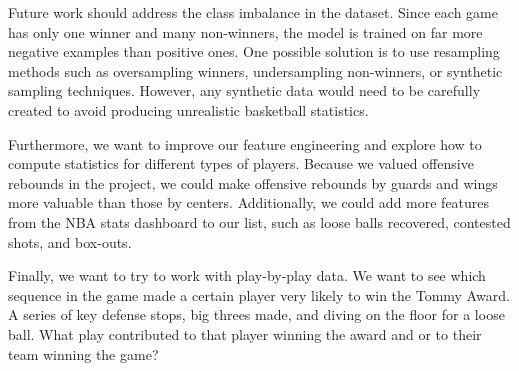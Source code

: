 \documentclass[11pt]{article}
\begin{document}
Future work should address the class imbalance in the dataset. Since each game has only one winner and many non-winners, the model is trained on far more negative examples than positive ones. One possible solution is to use resampling methods such as oversampling winners, undersampling non-winners, or synthetic sampling techniques. However, any synthetic data would need to be carefully created to avoid producing unrealistic basketball statistics.

Furthermore, we want to improve our feature engineering and explore how to compute statistics for different types of players. Because we valued offensive rebounds in the project, we could make offensive rebounds by guards and wings more valuable than those by centers. Additionally, we could add more features from the NBA stats dashboard to our list, such as loose balls recovered, contested shots, and box-outs.

Finally, we want to try to work with play-by-play data. We want to see which sequence in the game made a certain player very likely to win the Tommy Award. A series of key defense stops, big threes made, and diving on the floor for a loose ball. What play contributed to that player winning the award and or to their team winning the game?
\end{document}
